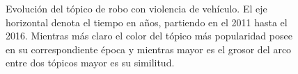 \begin{figure}
\caption{Evolución del tópico de robo con violencia de vehículo. El eje horizontal denota el tiempo en años, partiendo en el 2011 hasta el 2016. Mientras más claro el color del tópico más popularidad posee en su correspondiente época y mientras mayor es el grosor del arco entre dos tópicos mayor es su similitud.}
\label{img:violence_topic}
\end{figure}
